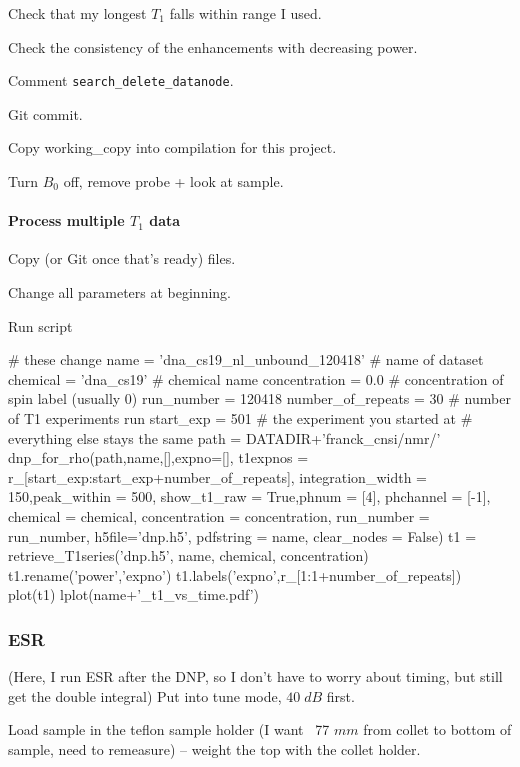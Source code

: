 Check that my longest $T_1$ falls within range I used.

Check the consistency of the enhancements with decreasing power.

Comment {\tt search\_delete\_datanode}.

Git commit.

Copy working\_copy into compilation for this project.

Turn $B_0$ off, remove probe + look at sample.

\paragraph{Process multiple $T_1$ data}
Copy (or Git once that's ready) files.

Change all parameters at beginning.

Run script

\begin{scriptsize}
\begin{python}[off]
# these change
name = 'dna_cs19_nl_unbound_120418' # name of dataset
chemical = 'dna_cs19' # chemical name
concentration = 0.0 # concentration of spin label (usually 0)
run_number =  120418
number_of_repeats = 30 # number of T1 experiments run
start_exp = 501 # the experiment you started at
# everything else stays the same
path = DATADIR+'franck_cnsi/nmr/'
dnp_for_rho(path,name,[],expno=[],
    t1expnos = r_[start_exp:start_exp+number_of_repeats],
    integration_width = 150,peak_within = 500,
    show_t1_raw = True,phnum = [4],
    phchannel = [-1],
    chemical = chemical,
    concentration = concentration,
    run_number = run_number,
    h5file='dnp.h5',
    pdfstring = name,
    clear_nodes = False)
t1 = retrieve_T1series('dnp.h5',
    name,
    chemical,
    concentration)
t1.rename('power','expno')
t1.labels('expno',r_[1:1+number_of_repeats])
plot(t1)
lplot(name+'_t1_vs_time.pdf')
\end{python}
\end{scriptsize}
\subsubsection{ESR}

(Here, I run ESR after the DNP, so I don't have to worry about timing, but still get the double integral)
Put into tune mode, $40\;dB$ first.

Load sample in the teflon sample holder (I want ~77 $mm$ from collet to bottom of sample, need to remeasure) -- weight the top with the collet holder.

